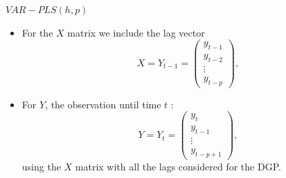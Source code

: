 \documentclass{beamer}
\newcommand{\?}{?`}
\begin{document}
\begin{frame}{$VAR-PLS(h,p)$}
  \begin{itemize}
  \item For the $X$ matrix we include the lag vector
      \begin{displaymath}
      X=Y_{t-1}=\left(
        \begin{array}{c}
          y_{t-1} \\
          y_{t-2} \\
          \vdots \\
          y_{t-p}
        \end{array}
      \right),
    \end{displaymath}
  \item For $Y$, the observation until time $t$ :
    \begin{displaymath}
      Y=Y_{t}=\left(
        \begin{array}{c}
          y_t \\
          y_{t-1} \\
          \vdots \\
          y_{t-p+1}
        \end{array}
      \right),
    \end{displaymath}
    using the $X$ matrix with all the lags considered for the DGP.
  \end{itemize}
\end{frame}
\end{document}
